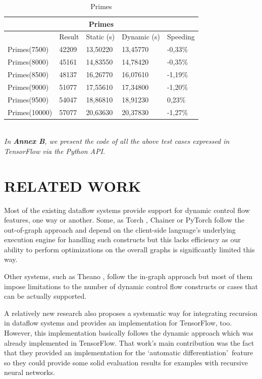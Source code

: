 \documentclass[ack,preface]{dithesis}
\begin{document}
\begin{table}[h!]
\centering
\begin{tabular}{ |p{3cm}||p{2cm}|p{3cm}|p{3cm}||p{2cm}|  }

 \hline
 \multicolumn{5}{|c|}{\textbf{\footnotesize Primes}} \\
 \hline
 	& Result &Static (s)&Dynamic (s)&Speeding\\
 \hline
 Primes(7500)   & 42209  &13,50220    & 13,45770 &   -0,33\%\\
 Primes(8000)   & 45161  &14,83550    &  14,78420  &  -0,35\%\\
 Primes(8500)   & 48137  & 16,26770   &  16,07610  &  -1,19\%\\
 Primes(9000)   & 51077  & 17,55610   & 17,34800   &  -1,20\%\\
 Primes(9500)   & 54047  & 18,86810   &  18,91230  &   0,23\%\\
 Primes(10000) & 57077  &20,63630    &  20,37830  &  -1,27\%\\
 \hline
\end{tabular}
\caption{Primes}
\label{table:1}
\end{table}

\ \\
\textit{In \textbf{Annex B}, we present the code of all the above test cases expressed in TensorFlow via the Python API.}

\chapter{RELATED WORK}

Most of the existing dataflow systems provide support for dynamic control flow features, one way or another. 
Some, as Torch \cite{Torch}, Chainer \cite{Chainer_learningsys2015} or PyTorch \cite{Paszke2017} follow the out-of-graph approach and depend on the client-side language's underlying execution engine for handling such constructs but this lacks efficiency as our ability to perform optimizations on the overall graphs is significantly limited this way. 

Other systems, such as Theano \cite{Theano1}, follow the in-graph approach but most of them impose limitations to the number of dynamic control flow constructs or cases that can be actually supported. 

A relatively new research \cite{Jeong:2018} also proposes a systematic way for integrating recursion in dataflow systems and provides an implementation for TensorFlow, too. However, 
this implementation basically follows the dynamic approach which was already implemented in TensorFlow. That work's main contribution was the fact that they provided an implementation for the \lq automatic differentiation\rq  \ feature  so they could provide some solid evaluation results for examples with recursive neural networks.
\end{document}
